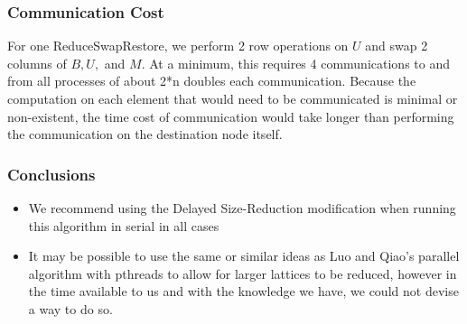 \documentclass{beamer}
\begin{document}
\begin{frame}
\frametitle{Communication Cost}
For one ReduceSwapRestore, we perform 2 row operations on $U$ and swap 2 columns of $B,U,$ and $M$.
At a minimum, this requires 4 communications to and from all processes  of about 2*n doubles each communication.
Because the computation on each element that would need to be communicated is minimal or non-existent, the time cost of communication would take longer than performing the communication on the destination node itself.
\end{frame}
\begin{frame}
\frametitle{Conclusions}
\begin{itemize}
\item We recommend using the Delayed Size-Reduction modification when running this algorithm in serial in all cases
\item It may be possible to use the same or similar ideas as Luo and Qiao's parallel algorithm with pthreads to allow for larger lattices to be reduced, however in the time available to us and with the knowledge we have, we could not devise a way to do so.
\end{itemize}
\end{frame}
\end{document}

